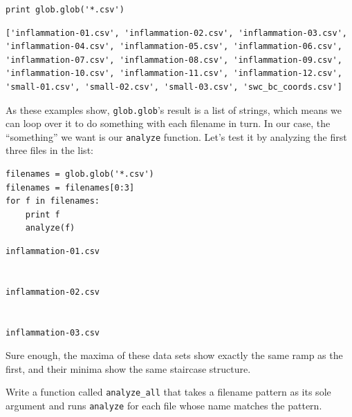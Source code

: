 \documentclass{book}
\begin{document}
\begin{verbatim}
print glob.glob('*.csv')
\end{verbatim}

\begin{verbatim}
['inflammation-01.csv', 'inflammation-02.csv', 'inflammation-03.csv', 'inflammation-04.csv', 'inflammation-05.csv', 'inflammation-06.csv', 'inflammation-07.csv', 'inflammation-08.csv', 'inflammation-09.csv', 'inflammation-10.csv', 'inflammation-11.csv', 'inflammation-12.csv', 'small-01.csv', 'small-02.csv', 'small-03.csv', 'swc_bc_coords.csv']
\end{verbatim}

As these examples show, \texttt{glob.glob}'s result is a list of
strings, which means we can loop over it to do something with each
filename in turn. In our case, the ``something'' we want is our
\texttt{analyze} function. Let's test it by analyzing the first three
files in the list:

\begin{verbatim}
filenames = glob.glob('*.csv')
filenames = filenames[0:3]
for f in filenames:
    print f
    analyze(f)
\end{verbatim}

\begin{verbatim}
inflammation-01.csv


inflammation-02.csv


inflammation-03.csv

\end{verbatim}

Sure enough, the maxima of these data sets show exactly the same ramp as
the first, and their minima show the same staircase structure.

\begin{challenge}
  Write a function called \texttt{analyze\_all} that takes a filename
  pattern as its sole argument and runs \texttt{analyze} for each file
  whose name matches the pattern.
\end{challenge}
\end{document}
